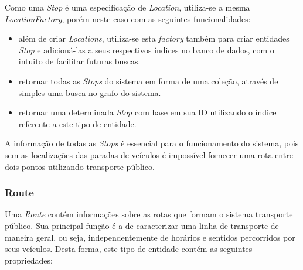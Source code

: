Como uma \emph{Stop} é uma especificação de \emph{Location}, utiliza-se a mesma \emph{LocationFactory}, porém neste caso com as seguintes funcionalidades:
\begin{itemize}
	\item além de criar \emph{Locations}, utiliza-se esta \emph{factory} também para criar entidades \emph{Stop} e adicioná-las a seus respectivos índices no banco 		de dados, com o intuito de facilitar futuras buscas.
	\item retornar todas as \emph{Stops} do sistema em forma de uma coleção, através de simples uma busca no grafo do sistema.
	\item retornar uma determinada \emph{Stop} com base em sua ID utilizando o índice referente a este tipo de entidade.
\end{itemize}

A informação de todas as \emph{Stops} é essencial para o funcionamento do sistema, pois sem as localizações das paradas de veículos é impossível fornecer uma rota entre dois pontos utilizando transporte público.

\subsubsection{Route}
Uma \emph{Route} contém informações sobre as rotas que formam o sistema transporte público.
Sua principal função é a de caracterizar uma linha de transporte de maneira geral, ou seja, independentemente de horários e sentidos percorridos por seus veículos.
Desta forma, este tipo de entidade contém as seguintes propriedades:

